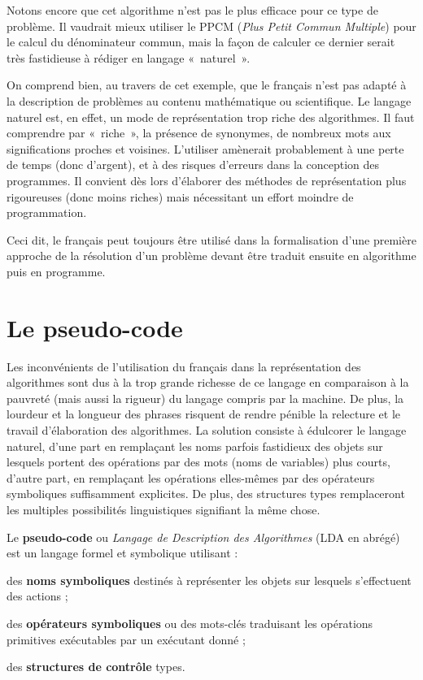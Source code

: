 		Notons encore que cet algorithme n’est pas le
		plus efficace pour ce type de problème. 
		Il vaudrait mieux utiliser le PPCM 
		(\textit{Plus Petit Commun Multiple}) 
		pour le calcul du dénominateur commun, mais la façon
		de calculer ce dernier serait très fastidieuse à rédiger en langage
		«~naturel~».

		On comprend bien, au travers de cet exemple, que
		le français n’est pas adapté à la description de problèmes au contenu
		mathématique ou scientifique. Le langage naturel est, en effet, un mode
		de représentation trop riche des algorithmes. Il faut comprendre par
		«~riche~», la présence de synonymes, de nombreux mots aux
		significations proches et voisines. L’utiliser amènerait probablement à
		une perte de temps (donc d’argent), et à des risques d’erreurs dans la
		conception des programmes. Il convient dès lors d’élaborer des méthodes
		de représentation plus rigoureuses (donc moins riches) mais nécessitant
		un effort moindre de programmation.

		Ceci dit, le français peut toujours être
		utilisé dans la formalisation d’une première approche de la résolution
		d’un problème devant être traduit ensuite en algorithme puis en
		programme.

	\section{Le pseudo-code}
	
		Les inconvénients de l’utilisation du français dans la représentation
		des algorithmes sont dus à la trop grande richesse de ce langage en
		comparaison à la pauvreté (mais aussi la rigueur) du langage compris
		par la machine. De plus, la lourdeur et la longueur des phrases
		risquent de rendre pénible la relecture et le travail d’élaboration des
		algorithmes. La solution consiste à édulcorer le langage naturel, d’une
		part en remplaçant les noms parfois fastidieux des objets sur lesquels
		portent des opérations par des mots (noms de variables) plus courts,
		d’autre part, en remplaçant les opérations elles-mêmes par des
		opérateurs symboliques suffisamment explicites. De plus, des structures
		types remplaceront les multiples possibilités linguistiques signifiant
		la même chose.

		Le \textbf{pseudo-code} ou \textit{Langage de Description des
		Algorithmes} (LDA en abrégé) est un langage formel et symbolique
		utilisant :

		\begin{liste}
		\item
			des \textbf{noms symboliques} destinés à représenter les objets sur
			lesquels s’effectuent des actions ;
		\item
			des \textbf{opérateurs symboliques} ou des mots-clés traduisant les
			opérations primitives exécutables par un exécutant donné ;
		\item
			des \textbf{structures de contrôle} types.
		\end{liste}

